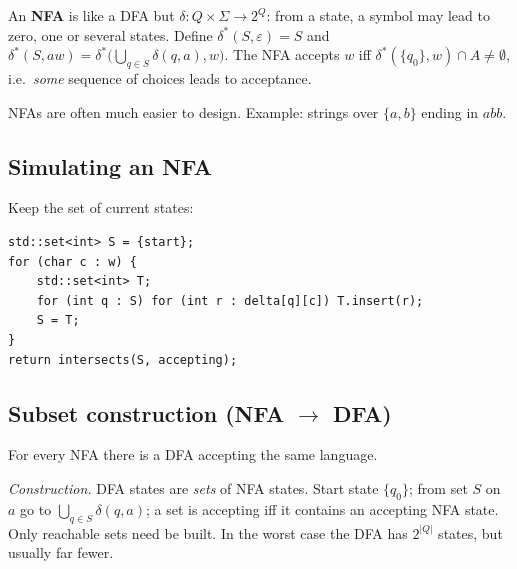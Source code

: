 \begin{definition}
An \textbf{NFA} is like a DFA but $\delta : Q\times\Sigma \to 2^Q$: from a state, a symbol
may lead to zero, one or several states. Define $\delta^*(S,\varepsilon) = S$ and
$\delta^*(S, aw) = \delta^*\big(\bigcup_{q\in S}\delta(q,a), w\big)$. The NFA accepts $w$
iff $\delta^*(\{q_0\}, w)\cap A \ne \emptyset$, i.e.\ \emph{some} sequence of choices leads to
acceptance.
\end{definition}

NFAs are often much easier to design. Example: strings over $\{a,b\}$ ending in $abb$.
\begin{center}
\end{center}

\subsection{Simulating an NFA}
Keep the set of current states:
\begin{lstlisting}[style=cpp]
std::set<int> S = {start};
for (char c : w) {
    std::set<int> T;
    for (int q : S) for (int r : delta[q][c]) T.insert(r);
    S = T;
}
return intersects(S, accepting);
\end{lstlisting}

\subsection{Subset construction (NFA \texorpdfstring{$\to$}{to} DFA)}
\begin{theorem}
For every NFA there is a DFA accepting the same language.
\end{theorem}
\emph{Construction.} DFA states are \emph{sets} of NFA states. Start state $\{q_0\}$; from
set $S$ on $a$ go to $\bigcup_{q\in S}\delta(q,a)$; a set is accepting iff it contains an
accepting NFA state. Only reachable sets need be built. In the worst case the DFA has
$2^{|Q|}$ states, but usually far fewer.


